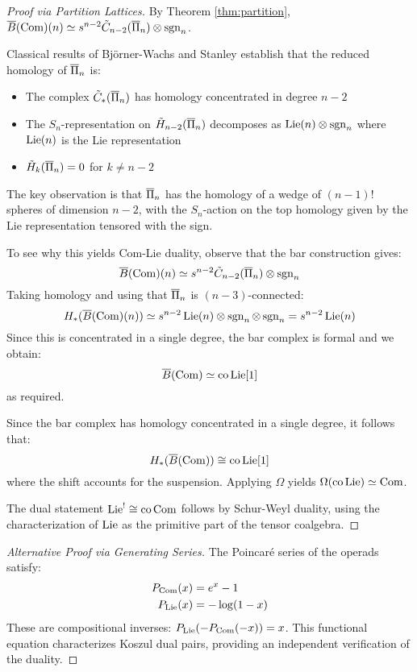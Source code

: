 \begin{proof}[Proof via Partition Lattices]
By Theorem \ref{thm:partition}, $\overline{B}(\operatorname{Com})(n) \simeq s^{n-2}\tilde{C}_{n-2}(\overline{\Pi}_n) \otimes \operatorname{sgn}_n$.
 
Classical results of Björner-Wachs \cite{BW93} and Stanley \cite{Sta97} establish that the reduced homology of $\overline{\Pi}_n$ is:
\begin{itemize}
\item The complex $\tilde{C}_*(\overline{\Pi}_n)$ has homology concentrated in degree $n-2$
\item The $S_n$-representation on $\tilde{H}_{n-2}(\overline{\Pi}_n)$ decomposes as $\operatorname{Lie}(n) \otimes \operatorname{sgn}_n$ where $\operatorname{Lie}(n)$ is the Lie representation
\item $\tilde{H}_k(\overline{\Pi}_n) = 0$ for $k \neq n-2$
\end{itemize}
 
The key observation is that $\overline{\Pi}_n$ has the homology of a wedge of $(n-1)!$ spheres of dimension $n-2$, with the $S_n$-action on the top homology given by the Lie representation tensored with the sign.

To see why this yields Com-Lie duality, observe that the bar construction gives:
$$\overline{B}(\operatorname{Com})(n) \simeq s^{n-2}\tilde{C}_{n-2}(\overline{\Pi}_n) \otimes \operatorname{sgn}_n$$
Taking homology and using that $\overline{\Pi}_n$ is $(n-3)$-connected:
$$H_*(\overline{B}(\operatorname{Com})(n)) \simeq s^{n-2}\operatorname{Lie}(n) \otimes \operatorname{sgn}_n \otimes \operatorname{sgn}_n = s^{n-2}\operatorname{Lie}(n)$$
Since this is concentrated in a single degree, the bar complex is formal and we obtain:
$$\overline{B}(\operatorname{Com}) \simeq \text{co}\operatorname{Lie}[1]$$
as required.
 
Since the bar complex has homology concentrated in a single degree, it follows that:
\[
H_*(\overline{B}(\operatorname{Com})) \cong \text{co}\operatorname{Lie}[1]
\]
where the shift accounts for the suspension. Applying $\Omega$ yields $\Omega(\text{co}\operatorname{Lie}) \simeq \operatorname{Com}$.
 
The dual statement $\operatorname{Lie}^! \cong \text{co}\operatorname{Com}$ follows by Schur-Weyl duality, using the characterization of $\operatorname{Lie}$ as the primitive part of the tensor coalgebra.
\end{proof}
 
\begin{proof}[Alternative Proof via Generating Series]
The Poincaré series of the operads satisfy:
\begin{align}
P_{\operatorname{Com}}(x) &= e^x - 1 \\
P_{\operatorname{Lie}}(x) &= -\log(1 - x)
\end{align}
These are compositional inverses: $P_{\operatorname{Lie}}(-P_{\operatorname{Com}}(-x)) = x$. This functional equation characterizes Koszul dual pairs, providing an independent verification of the duality.
\end{proof}
 
